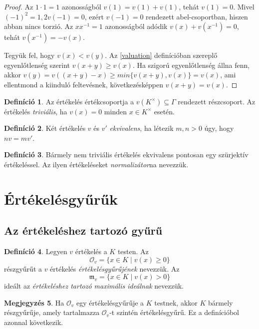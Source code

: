 \documentclass[11pt,a4paper]{article}
\newcommand{\m}{\mathfrak{m}}
\newcommand{\Ov}{\mathcal{O}_v}
\theoremstyle{definition}
\newtheorem{definition}{Definíció}[section]
\newtheorem{remark}[definition]{Megjegyzés}
\theoremstyle{plain}
\begin{document}
{\begin{proof}
Az $1 \cdot 1 = 1$ azonosságból $v(1) = v(1) + v(1)$, tehát $v(1) = 0$.
Mivel $(-1)^2 = 1, 2v(-1) = 0$, ezért $v(-1) = 0$ rendezett abel-csoportban,
hiszen abban nincs torzió. Az $xx^{-1} = 1$ azonosságból adódik $v(x)+v(x^{-1}) =
0$, tehát $v(x^{-1}) = -v(x)$.

Tegyük fel, hogy $v(x) < v(y)$. Az \ref{valuation} definícióban szereplő egyenlőtlenség
szerint $v(x + y) \geq v(x)$. Ha szigorú egyenlőtlenség állna fenn, akkor
$v(y) = v((x + y) - x) \geq min\{v(x + y), v(x)\} = v(x)$,
ami ellentmond a kiinduló feltevésnek, következésképpen $v(x+y) = v(x)$.
\end{proof}

\begin{definition}
    Az értékelés értékcsoportja a $v(K^\times) \subseteq \Gamma$ rendezett részcsoport. Az értékelés \textit{triviális}, ha $v(x) = 0$ minden $x \in K^\times$ esetén.
\end{definition}%
\begin{definition}
    Két értékelés $v$ és $v'$ \textit{ekvivalens}, ha létezik $m,n>0$ úgy, hogy $nv = mv'$. 
\end{definition}
\begin{definition}
    Bármely nem triviális értékelés ekvivalens pontosan egy szürjektív értékeléssel. Az ilyen értékeléseket \textit{normalizátor}na nevezzük. 
\end{definition}
\section{Értékelésgyűrűk}

\subsection{Az értékeléshez tartozó gyűrű}

\begin{definition}
Legyen $v$ értékelés a $K$ testen. Az
\[
\Ov = \{x\in K \mid v(x)\ge 0\}
\]
részgyűrűt a $v$ értékelés \textit{értékelésgyűrűjének} nevezzük. Az 
\begin{equation*}
    \m_v = \{x\in K\mid v(x) > 0\}
\end{equation*}
ideált az \textit{értékeléshez tartozó maximális ideálnak} nevezzük. 
\end{definition}
\begin{remark}
    Ha $\Ov$ egy értékelésgyűrűje a $K$ testnek, akkor $K$ bármely részgyűrűje, amely tartalmazza $\Ov$-t szintén értékelésgyűrű. Ez a definícióbol azonnal következik.
\end{remark}

}
\end{document}
